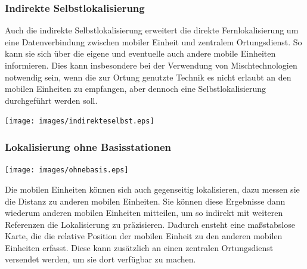 \subsubsection{Indirekte Selbstlokalisierung} 
	\begin{minipage}{\textwidth}
		\begin{minipage}[c][6cm][t]{0.6\textwidth\relax}
			Auch die indirekte Selbstlokalisierung erweitert die direkte Fernlokalisierung um eine Datenverbindung zwischen mobiler Einheit und zentralem Ortungsdienst. 
			So kann sie sich über die eigene und eventuelle auch andere mobile Einheiten informieren. 
			Dies kann insbesondere bei der Verwendung von Mischtechnologien notwendig sein, wenn die zur Ortung genutzte Technik es nicht erlaubt an den mobilen Einheiten zu empfangen, aber dennoch eine Selbstlokalisierung durchgeführt werden soll.
		\end{minipage}\hfill
		\begin{minipage}[c][6cm][c]{0.4\textwidth\relax}
			\centering
			\texttt{[image: images/indirekteselbst.eps]} 
		\end{minipage}
	\end{minipage}


\subsubsection{Lokalisierung ohne Basisstationen} 
	\begin{minipage}{\textwidth}
		\begin{minipage}[c][6cm][c]{0.4\textwidth\relax}
			\centering
			\texttt{[image: images/ohnebasis.eps]} 
		\end{minipage}\hfill
		\begin{minipage}[c][6cm][t]{0.6\textwidth\relax}
			Die mobilen Einheiten können sich auch gegenseitig lokalisieren, dazu messen sie die Distanz zu anderen mobilen Einheiten.
			Sie können diese Ergebnisse dann wiederum anderen mobilen Einheiten mitteilen, um so indirekt mit weiteren Referenzen die Lokalisierung zu präzisieren. 
			Dadurch ensteht eine maßstabslose Karte, die die relative Position der mobilen Einheit zu den anderen mobilen Einheiten erfasst.
			Diese kann zusätzlich an einen zentralen Ortungsdienst versendet werden, um sie dort verfügbar zu machen.
		\end{minipage}
	\end{minipage}


